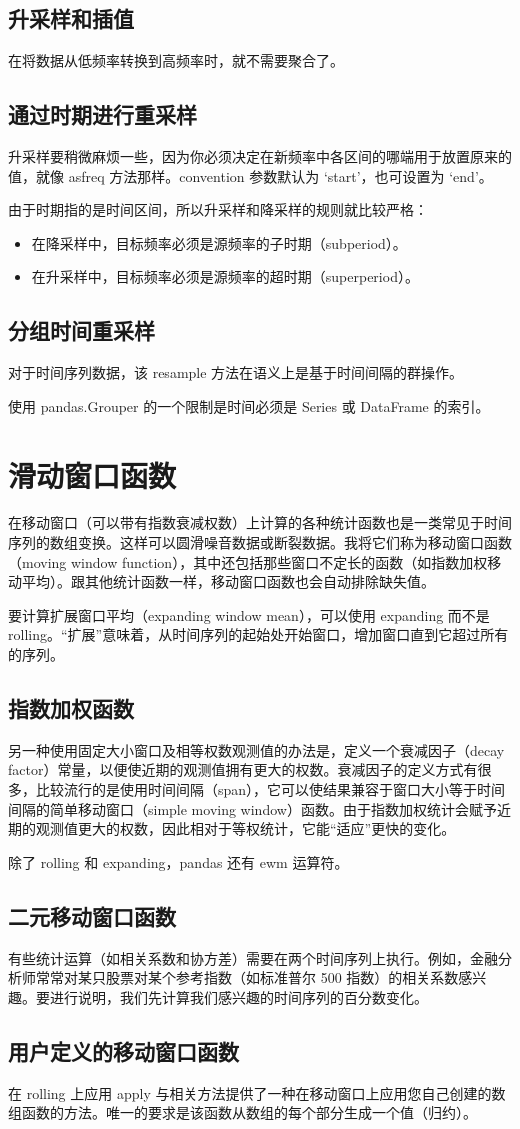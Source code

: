 \subsection{升采样和插值}
在将数据从低频率转换到高频率时，就不需要聚合了。
\subsection{通过时期进行重采样}
升采样要稍微麻烦一些，因为你必须决定在新频率中各区间的哪端用于放置原来的值，就像 asfreq 方法那样。convention 参数默认为 `start'，也可设置为 `end'。

由于时期指的是时间区间，所以升采样和降采样的规则就比较严格：
\begin{itemize}
    \item 在降采样中，目标频率必须是源频率的子时期（subperiod）。
    \item 在升采样中，目标频率必须是源频率的超时期（superperiod）。
\end{itemize}
\subsection{分组时间重采样}
对于时间序列数据，该 resample 方法在语义上是基于时间间隔的群操作。

使用 pandas.Grouper 的一个限制是时间必须是 Series 或 DataFrame 的索引。
\section{滑动窗口函数}
在移动窗口（可以带有指数衰减权数）上计算的各种统计函数也是一类常见于时间序列的数组变换。这样可以圆滑噪音数据或断裂数据。我将它们称为移动窗口函数（moving window function），其中还包括那些窗口不定长的函数（如指数加权移动平均）。跟其他统计函数一样，移动窗口函数也会自动排除缺失值。

要计算扩展窗口平均（expanding window mean），可以使用 expanding 而不是 rolling。“扩展”意味着，从时间序列的起始处开始窗口，增加窗口直到它超过所有的序列。
\subsection{指数加权函数}
另一种使用固定大小窗口及相等权数观测值的办法是，定义一个衰减因子（decay factor）常量，以便使近期的观测值拥有更大的权数。衰减因子的定义方式有很多，比较流行的是使用时间间隔（span），它可以使结果兼容于窗口大小等于时间间隔的简单移动窗口（simple moving window）函数。由于指数加权统计会赋予近期的观测值更大的权数，因此相对于等权统计，它能“适应”更快的变化。

除了 rolling 和 expanding，pandas 还有 ewm 运算符。
\subsection{二元移动窗口函数}
有些统计运算（如相关系数和协方差）需要在两个时间序列上执行。例如，金融分析师常常对某只股票对某个参考指数（如标准普尔 500 指数）的相关系数感兴趣。要进行说明，我们先计算我们感兴趣的时间序列的百分数变化。

\subsection{用户定义的移动窗口函数}
在 rolling 上应用 apply 与相关方法提供了一种在移动窗口上应用您自己创建的数组函数的方法。唯一的要求是该函数从数组的每个部分生成一个值（归约）。